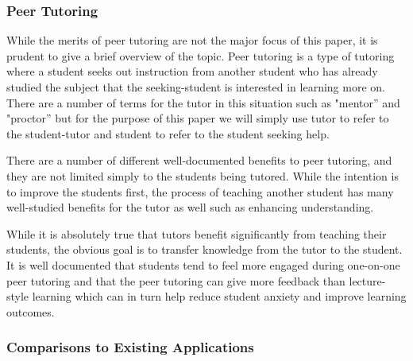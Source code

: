 \subsubsection{Peer Tutoring}
\label{peer-tutoring}
While the merits of peer tutoring are not the major focus of this paper, it is
prudent to give a brief overview of the topic. Peer tutoring is a type of
tutoring where a student seeks out instruction from another student who has
already studied the subject that the seeking-student is interested in learning more on.
There are a number of terms for the tutor in this situation such as "mentor''
and "proctor'' but for the purpose of this paper we will simply use tutor to
refer to the student-tutor and student to refer to the student seeking help.
\cite{kim}

There are a number of different well-documented benefits to peer tutoring, and
they are not limited simply to the students being tutored. While the intention
is to improve the students first, the process of teaching another student has
many well-studied benefits for the tutor as well such as enhancing
understanding. \cite{kim}

While it is absolutely true that tutors benefit significantly from teaching
their students, the obvious goal is to transfer knowledge from the tutor to the
student. It is well documented that students tend to feel more engaged during
one-on-one peer tutoring and that the peer tutoring can give more feedback than
lecture-style learning which can in turn help reduce student anxiety and improve
learning outcomes. \cite{topping}

\subsubsection{Comparisons to Existing Applications}
\label{comparisons}


